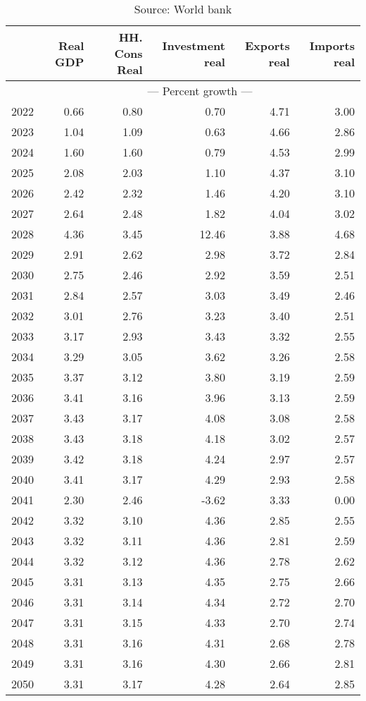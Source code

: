 \documentclass{article}
\begin{document}
\begin{table}[ht]
\caption*{Table 42: GDP components}
\begin{tabular}{lrrrrr}
\toprule
 & Real GDP & HH. Cons Real & Investment real & Exports real & Imports real \\
\midrule
 & \multicolumn{5}{c}{--- Percent growth ---} \\
2022 & 0.66 & 0.80 & 0.70 & 4.71 & 3.00 \\
2023 & 1.04 & 1.09 & 0.63 & 4.66 & 2.86 \\
2024 & 1.60 & 1.60 & 0.79 & 4.53 & 2.99 \\
2025 & 2.08 & 2.03 & 1.10 & 4.37 & 3.10 \\
2026 & 2.42 & 2.32 & 1.46 & 4.20 & 3.10 \\
2027 & 2.64 & 2.48 & 1.82 & 4.04 & 3.02 \\
2028 & 4.36 & 3.45 & 12.46 & 3.88 & 4.68 \\
2029 & 2.91 & 2.62 & 2.98 & 3.72 & 2.84 \\
2030 & 2.75 & 2.46 & 2.92 & 3.59 & 2.51 \\
2031 & 2.84 & 2.57 & 3.03 & 3.49 & 2.46 \\
2032 & 3.01 & 2.76 & 3.23 & 3.40 & 2.51 \\
2033 & 3.17 & 2.93 & 3.43 & 3.32 & 2.55 \\
2034 & 3.29 & 3.05 & 3.62 & 3.26 & 2.58 \\
2035 & 3.37 & 3.12 & 3.80 & 3.19 & 2.59 \\
2036 & 3.41 & 3.16 & 3.96 & 3.13 & 2.59 \\
2037 & 3.43 & 3.17 & 4.08 & 3.08 & 2.58 \\
2038 & 3.43 & 3.18 & 4.18 & 3.02 & 2.57 \\
2039 & 3.42 & 3.18 & 4.24 & 2.97 & 2.57 \\
2040 & 3.41 & 3.17 & 4.29 & 2.93 & 2.58 \\
2041 & 2.30 & 2.46 & -3.62 & 3.33 & 0.00 \\
2042 & 3.32 & 3.10 & 4.36 & 2.85 & 2.55 \\
2043 & 3.32 & 3.11 & 4.36 & 2.81 & 2.59 \\
2044 & 3.32 & 3.12 & 4.36 & 2.78 & 2.62 \\
2045 & 3.31 & 3.13 & 4.35 & 2.75 & 2.66 \\
2046 & 3.31 & 3.14 & 4.34 & 2.72 & 2.70 \\
2047 & 3.31 & 3.15 & 4.33 & 2.70 & 2.74 \\
2048 & 3.31 & 3.16 & 4.31 & 2.68 & 2.78 \\
2049 & 3.31 & 3.16 & 4.30 & 2.66 & 2.81 \\
2050 & 3.31 & 3.17 & 4.28 & 2.64 & 2.85 \\
\bottomrule
\end{tabular}
\caption*{Source: World bank }
\end{table}
\end{document}
